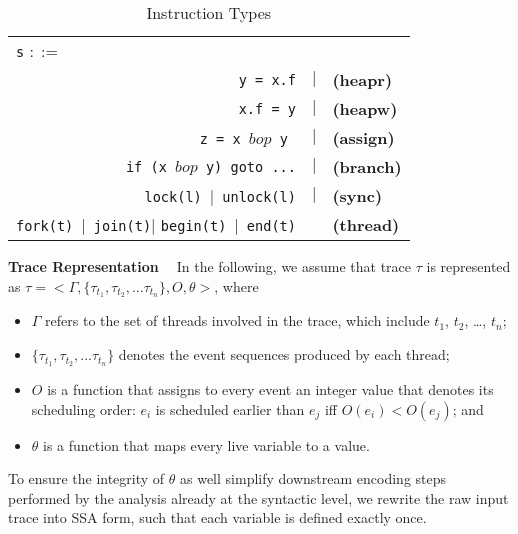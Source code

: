 \begin{table}
	\begin{center}
		\begin{tabular}{rcl}
			\multicolumn{1}{l}{{\tt s} $::=$} & & \\
			{\tt y = x.f} & $|$ & {\bf (heapr)} \\ 
			{\tt x.f = y}  & $|$ & {\bf (heapw)} \\ %
			{\tt z = x $bop$ y}\  & $|$ & {\bf (assign)} \\ %
			{\tt if (x $bop$  y) goto ...} & $|$ &  {\bf (branch)} \\
			{\tt lock(l)}\ $|$\ {\tt unlock(l)}  & $|$& {\bf (sync)} \\
			{\tt fork(t)}\ $|$\ {\tt join(t)}$|$ {\tt begin(t)}\ $|$\ {\tt end(t)} &  & {\bf (thread)}
		\end{tabular}
	\end{center}
	\caption{\label{Ta:syntax}Instruction Types}
\end{table}


{\bf Trace Representation \ } In the following, we assume that trace $\tau$ is represented as $\tau=<\Gamma , \{\tau_{t_1}, \tau_{t_2}, \dots \tau_{t_n} \}, O, \theta>$, where
\begin{itemize}
\item  $\Gamma$ refers to the set of threads involved in the trace, which include $t_1$, $t_2$, \dots, $t_n$;
\item   $\{\tau_{t_1}, \tau_{t_2}, \dots \tau_{t_n} \}$ denotes the event sequences produced by each thread;
\item  $O$ is a function that assigns  to every event an integer value that denotes its scheduling order: $e_i$ is scheduled earlier than $e_j$ iff $O(e_i)<O(e_j)$; and
\item  $\theta$ is a function that maps every live variable to a value. 
\end{itemize}
To ensure the integrity of $\theta$ as well simplify downstream encoding steps performed by the analysis already at the syntactic level, we rewrite the raw input trace into SSA form, such that each variable is defined exactly once.




